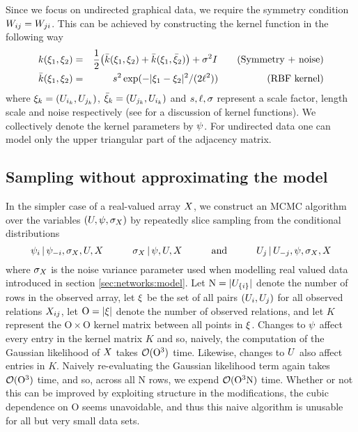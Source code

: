 Since we focus on undirected graphical data, we require the symmetry condition $W_{ij} = W_{ji}$. This can be achieved by constructing the kernel function in the following way \citep[e.g.][]{Duvenaud2014-em}
\begin{eqnarray}
k(\xi_1, \xi_2) & = & \frac{1}{2}\big(\bar{k}(\xi_1, \xi_2) + \bar{k}(\xi_1, \bar{\xi}_2)\big) + \sigma^2I \quad \quad \textrm{(Symmetry + noise)} \\
\bar{k}(\xi_1, \xi_2) & = & s^2\exp(-|\xi_1 - \xi_2|^2/(2\ell^2)) \quad \quad \quad \quad \quad \textrm{(RBF kernel)}
\end{eqnarray}
where $\xi_k = (U_{i_k}, U_{j_k})$, $\bar{\xi}_k= (U_{j_k}, U_{i_k})$ and $s, \ell, \sigma$ represent a scale factor, length scale and noise respectively (see \citep[e.g.][]{Rasmussen2006-ml} for a discussion of kernel functions). We collectively denote the kernel parameters by $\psi$.
For undirected data one can model only the upper triangular part of the adjacency matrix.

\subsection{Sampling without approximating the model}

\newcommand{\numobs}{\mathrm O}
\newcommand{\numnodes}{\mathrm N}
In the simpler case of a real-valued array $X$, we construct an MCMC algorithm over the variables $(U,\psi, \sigma_X)$ by repeatedly slice sampling \citep{Neal2003-zv} from the conditional distributions
\[
\psi_i \,|\, \psi_{-i}, \sigma_X, U, X
\qquad\quad
\sigma_X \,|\, \psi, U, X
\qquad\quad \text{and} \qquad\quad
U_j \,|\, U_{-j}, \psi, \sigma_X, X
\]
where $\sigma_X$ is the noise variance parameter used when modelling real valued data introduced in section \ref{sec:networks:model}.
Let $\numnodes = |\AHvar_{\lbrace i\rbrace}|$ denote the number of rows in the observed array,
let $\xi$ be the set of all pairs $(U_i,U_j)$ for all observed relations $X_{ij}$, 
let $\numobs = |\inputpoints|$ denote the number of observed relations,
and 
let $K$ represent the $\numobs \times \numobs$ kernel matrix between all points in $\xi$. Changes to $\psi$ affect every entry in the kernel matrix $K$ and so, naively, the computation of the Gaussian likelihood of $X$ takes $\CompOrder(\numobs^3)$ time.  Likewise, changes to $U$ also affect entries in $K$. Naively re-evaluating the Gaussian likelihood term again takes $\CompOrder(\numobs^3)$ time, and so, across all $\numnodes$ rows, we expend $\CompOrder(\numobs^3 \numnodes)$ time. Whether or not this can be improved by exploiting structure in the modifications, the cubic dependence on $\numobs$ seems unavoidable, and thus this naive algorithm is unusable for all but very small data sets. 


